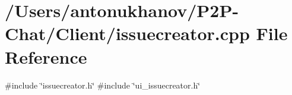 \section{/\+Users/antonukhanov/\+P2\+P-\/\+Chat/\+Client/issuecreator.cpp File Reference}
\label{issuecreator_8cpp}
{\ttfamily \#include \char`\"{}issuecreator.\+h\char`\"{}}\newline
{\ttfamily \#include \char`\"{}ui\+\_\+issuecreator.\+h\char`\"{}}\newline

